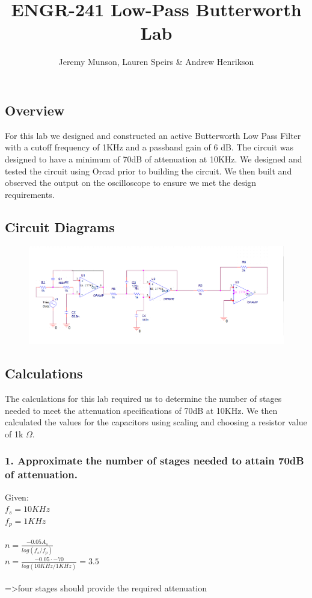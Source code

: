 \documentclass[11pt]{article}
\title{ENGR-241 Low-Pass Butterworth Lab}
\author{Jeremy Munson, Lauren Speirs \& Andrew Henrikson}
\begin{document}
	\maketitle
	\subsection*{Overview}
	For this lab we designed and  constructed an active Butterworth Low Pass Filter with a cutoff frequency of 1KHz and a passband gain of 6 dB. The circuit was designed to have a minimum of 70dB of attenuation at 10KHz. We designed and tested the circuit using Orcad prior to building the circuit. We then built and observed the output on the oscilloscope to ensure we met the design requirements.
	\subsection*{Circuit Diagrams}
		\begin{figure}[H]
		\centering
		\includegraphics[width=5.5in]{images/diagram.PNG}
	\end{figure}
	\subsection*{Calculations}
	The calculations for this lab required us to determine the number of stages needed to meet the attenuation specifications of 70dB at 10KHz. We then calculated the values for the capacitors using scaling and choosing a resistor value of 1k $\Omega$.
	\subsubsection*{1. Approximate the number of stages needed to attain 70dB of attenuation.}
	Given:\\
	$f_{s}=10KHz$\\
	$f_{p}=1KHz$\\\\
	$n=\frac{-0.05A_{s}}{log(f_{s}/f_{p})}$\\
	$n=\frac{-0.05\cdot -70}{log(10KHz/1KHz)}=3.5$\\\\
	=>four stages should provide the required attenuation
\end{document}
